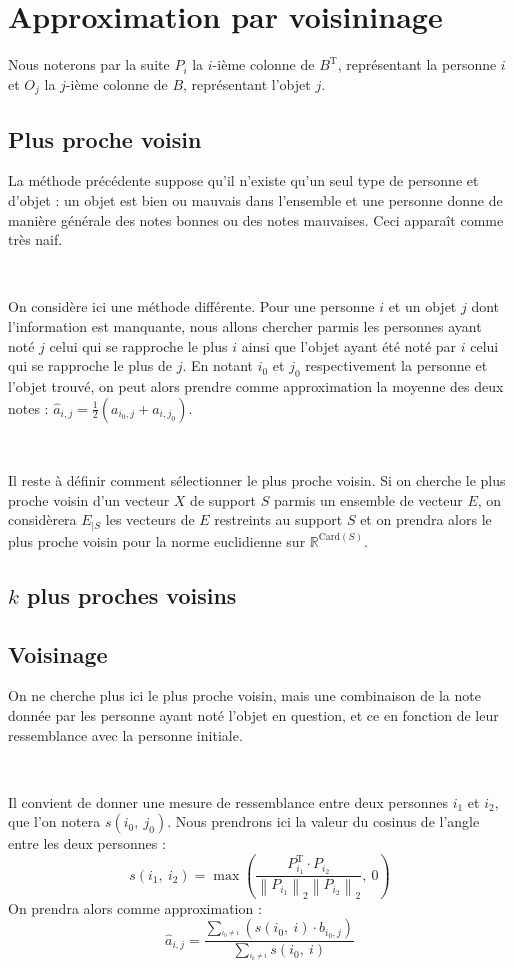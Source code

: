 \documentclass[12pt, a4paper]{article}
\newcommand{\B}{B} %
\newcommand{\Ac}[2]{a_{#1,#2}} %
\newcommand{\Bc}[2]{b_{#1,#2}} %
\newcommand{\Apc}[2]{\widehat{a}_{#1,#2}} %
\newcommand{\norme}[2]{\left\lVert #1 \right\rVert_{#2}} %
\newcommand{\tr}[1]{#1^{\mathrm{T}}} %
\newcommand{\pp}[1]{\left(#1\right)} %
\newcommand{\sdl}{

~

} %
\begin{document}
\section{Approximation par voisininage}

Nous noterons par la suite $P_i$ la $i$-ième colonne de $\tr{B}$, représentant la personne $i$ et $O_j$ la $j$-ième colonne de $\B$, représentant l'objet $j$.

\subsection{Plus proche voisin}

La méthode précédente suppose qu'il n'existe qu'un seul type de personne et d'objet : un objet est bien ou mauvais dans l'ensemble et une personne donne de manière générale des notes bonnes ou des notes mauvaises. Ceci apparaît comme très naif.
\sdl

On considère ici une méthode différente. Pour une personne $i$ et un objet $j$ dont l'information est manquante, nous allons chercher parmis les personnes ayant noté $j$ celui qui se rapproche le plus $i$ ainsi que l'objet ayant été noté par $i$ celui qui se rapproche le plus de $j$. En notant $i_0$ et $j_0$ respectivement la personne et l'objet trouvé, on peut alors prendre comme approximation la moyenne des deux notes : $\Apc{i}{j} = \frac{1}{2}\pp{\Ac{i_0}{j} + \Ac{i}{j_0}}$.

\sdl
Il reste à définir comment sélectionner le plus proche voisin. Si on cherche le plus proche voisin d'un vecteur $X$ de support $S$ parmis un ensemble de vecteur $E$, on considèrera $E_{|S}$ les vecteurs de $E$ restreints au support $S$ et on prendra alors le plus proche voisin pour la norme euclidienne sur $\mathbb{R}^{\mathrm{Card}\pp{S}}$.

\subsection{$k$ plus proches voisins}

\subsection{Voisinage}

On ne cherche plus ici le plus proche voisin, mais une combinaison de la note donnée par les personne ayant noté l'objet en question, et ce en fonction de leur ressemblance avec la personne initiale.
\sdl
Il convient de donner une mesure de ressemblance entre deux personnes $i_1$ et $i_2$, que l'on notera $s\pp{i_0,\:j_0}$.
Nous prendrons ici la valeur du cosinus de l'angle entre les deux personnes : \[
	s\pp{i_1,\:i_2} = \max\pp{\frac{\tr{P_{i_1}}\!\cdot\!P_{i_2}}{\norme{P_{i_1}}{2}\norme{P_{i_2}}{2}},\:0}
\]
On prendra alors comme approximation : \[
	\Apc{i}{j} = \frac{\underset{^{i_0\neq i}}{\sum}\pp{ s\pp{i_0,\:i}\!\cdot\!\Bc{i_0}{j}}}%
				{\underset{^{i_0\neq i}}{\sum}s\pp{i_0,\:i}}
\]
\end{document}
